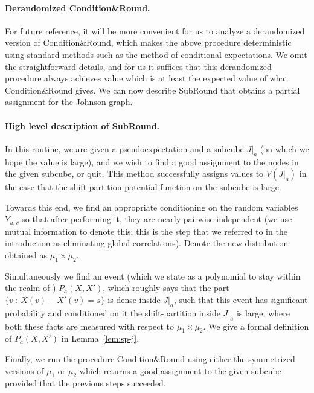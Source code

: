 \paragraph{Derandomized Condition\&Round.}
For future reference, it will be more convenient for us to analyze
a derandomized version of Condition\&Round, which makes the 
above procedure deterministic using standard methods such as 
the method of conditional expectations. We omit the straightforward details, and for us it suffices that this derandomized 
procedure always achieves value which is at least the 
expected value of what Condition\&Round gives.
\skipi
We can now describe SubRound that obtains a partial assignment for the Johnson graph. 

\paragraph{High level description of SubRound.}
In this routine, we are given a pseudoexpectation and a 
subcube $J|_a$ (on which we hope the value is large), and we wish to 
find a good assignment to the nodes in the given subcube, 
or quit. This method successfully assigns values to $V(J|_a)$ 
in the case that the shift-partition potential function on the subcube is large.

Towards this end, we find an appropriate conditioning on the random variables $Y_{u,v}$ so that after performing it, 
they are nearly pairwise independent (we use mutual information 
to denote this; this is the step that we referred to in 
the introduction as eliminating global correlations). Denote the new distribution obtained as $\mu_1 \times \mu_2$.

Simultaneously we find an event 
(which we state 
as a polynomial to stay within the realm of \sos) $P_a(X,X')$, which roughly says that 
the part $\{v~:~X(v)-X'(v) = s\}$ is dense inside $J|_a$, 
such that this event has significant probability 
and conditioned on it the shift-partition inside $J|_a$
is large, where both these facts are measured with respect to $\mu_1 \times \mu_2$. We give a formal definition of $P_a(X,X')$ in Lemma~\ref{lem:sp-j}.

Finally, we run the procedure Condition\&Round using either the symmetrized versions of $\mu_1$ or $\mu_2$ which 
returns a good assignment to the given subcube provided that the previous steps succeeded.

